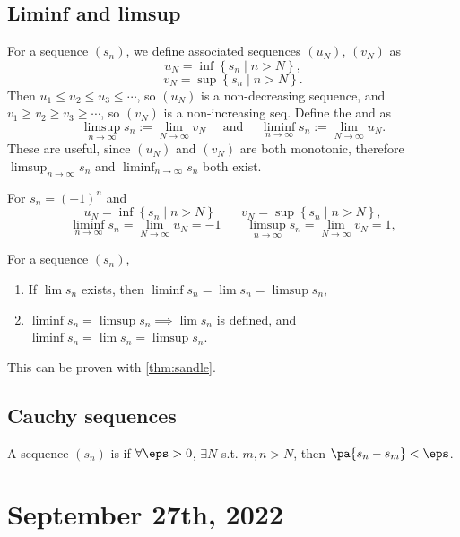 \documentclass[11pt]{scrartcl}
\numberwithin{equation}{section}
\begin{document}
\subsection{Liminf and limsup}
\begin{definition}
    For a sequence $(s_n)$, we define associated sequences $(u_N)$, $(v_N)$ as 
    \[ u_N = \inf \left\{s_n\mid n>N\right\}, \]
    \[ v_N = \sup \left\{s_n\mid n>N\right\}. \]
    Then $u_1 \leq u_2\leq u_3 \leq \cdots$, 
    so $(u_N)$ is a non-decreasing sequence, and 
    $v_1 \geq v_2\geq v_3 \geq \cdots$, so $(v_N)$ is a non-increasing seq.
    Define the \vocab{$\limsup$} and \vocab{$\liminf$} as
    \[ 
        \limsup_{n\rightarrow \infty} s_n := \lim_{N\rightarrow\infty}v_N 
        \quad \text{ and }\quad 
        \liminf_{n\rightarrow \infty} s_n := \lim_{N\rightarrow\infty}u_N. 
    \]
    These are useful, since $(u_N)$ and $(v_N)$ are both monotonic,
    therefore 
    $\limsup_{n\rightarrow \infty} s_n$ and 
    $\liminf_{n\rightarrow \infty} s_n$ both exist.
\end{definition}
\begin{example}
    For $s_n=(-1)^n$ and
    \[ u_N = \inf \left\{s_n\mid n>N\right\} \qquad 
    v_N = \sup \left\{s_n\mid n>N\right\}, \] 
    \[ \liminf_{n\rightarrow\infty} s_n = \lim_{N\rightarrow\infty}u_N = -1\qquad 
    \limsup_{n\rightarrow\infty} s_n = \lim_{N\rightarrow\infty}v_N = 1, \]
\end{example}
\begin{theorem}
    For a sequence $(s_n)$,
    \begin{enumerate}
        \item If $\lim s_n$ exists, then $\liminf s_n = \lim s_n =\limsup s_n$,
        \item $\liminf s_n =\limsup s_n \implies \lim s_n$ is defined,
        and $\liminf s_n = \lim s_n =\limsup s_n$.
    \end{enumerate}
\end{theorem}
This can be proven with \cref{thm:sandle}.

\subsection{Cauchy sequences}

\begin{definition}
    A sequence $(s_n)$ is  if 
    $\forall \eps>0$, $\exists N$ s.t. $m,n>N$, then 
    $\pa{s_n-s_m}<\eps$.
\end{definition}
\clearpage
\section{September 27th, 2022}
\end{document}
